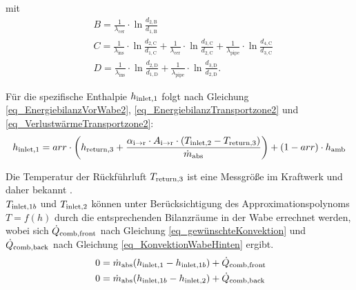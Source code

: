 \vspace*{-\baselineskip}mit
\begin{equation}
\begin{aligned} \label{eq_BestimmungHilfsgrößen}
& B=\frac{1}{\lambda_{\text {cer}}} \cdot \ln \frac{d_{2, \mathrm{B}}}{d_{1, \mathrm{B}}}                                                                                                                                                                              \\
& C=\frac{1}{\lambda_{\text {ins}}} \cdot \ln \frac{d_{2, \mathrm{C}}}{d_{1, \mathrm{C}}}+\frac{1}{\lambda_{\text {cer}}} \cdot \ln \frac{d_{3, \mathrm{C}}}{d_{2, \mathrm{C}}}+\frac{1}{\lambda_{\text {pipe}}} \cdot \ln \frac{d_{4, \mathrm{C}}}{d_{3, \mathrm{C}}} \\
& D=\frac{1}{\lambda_{\text {ins}}} \cdot \ln \frac{d_{2, \mathrm{D}}}{d_{1, \mathrm{D}}}+\frac{1}{\lambda_{\text {pipe}}} \cdot \ln \frac{d_{3, \mathrm{D}}}{d_{2, \mathrm{D}}}.
\end{aligned}
\end{equation}

Für die spezifische Enthalpie $h_{\mathrm{inlet,}1}$ folgt nach Gleichung \ref{eq_EnergiebilanzVorWabe2}, \ref{eq_EnergiebilanzTransportzone2} und \ref{eq_VerlustwärmeTransportzone2}:
\begin{equation} \label{eq_Hinlet1}
    h_{\mathrm{inlet,}1} = arr \cdot \left( h_{\mathrm{return,}3} + \frac{\alpha_{\mathrm{i\to r}} \cdot A_{\mathrm{i\to r}} \cdot (T_{\mathrm{inlet,}2} - T_{\mathrm{return,}3})}{\dot{m}_{\mathrm{abs}}}\right) + (1-arr) \cdot h_{\mathrm{amb}}
\end{equation}

Die Temperatur der Rückführluft $T_{\mathrm{return,}3}$ ist eine Messgröße im Kraftwerk und daher bekannt \cite[S.96]{DissGall}.\\
$T_{\mathrm{inlet,}1b}$ und $T_{\mathrm{inlet,}2}$ können unter Berücksichtigung des Approximationspolynoms $T=f(h)$ durch die entsprechenden Bilanzräume in der Wabe errechnet werden, wobei sich $\dot{Q}_{\mathrm{comb,front}}$ nach Gleichung \ref{eq_gewünschteKonvektion} und $\dot{Q}_{\mathrm{comb,back}}$ nach Gleichung \ref{eq_KonvektionWabeHinten} ergibt.
\begin{align}
    0 & = \MDotAbsorberCup (\SpecificEnthalpyTInlet{1}-\SpecificEnthalpyTInlet{1b}) + \QDotAbsorberCombFront \label{eq_Hinlet1b} \\ \text{\myequations{\quad Algebraische Gleichung zur Bestimmung von $\TInlet{1b}$}}
    0 & = \MDotAbsorberCup (\SpecificEnthalpyTInlet{1b}-\SpecificEnthalpyTInlet{2}) + \QDotAbsorberCombBack \label{eq_Hinlet2}
\end{align}


